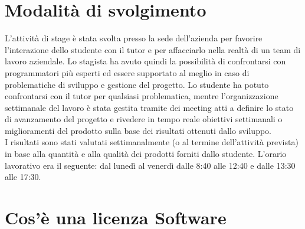 \section{Modalità di svolgimento}
L’attività di stage è stata svolta presso la sede dell’azienda per favorire l’interazione dello studente con il tutor e per affacciarlo nella realtà di un team di lavoro aziendale. Lo stagista ha avuto quindi la possibilità di confrontarsi con programmatori più esperti ed essere supportato al meglio in caso di problematiche di sviluppo e gestione del progetto.
Lo studente ha potuto confrontarsi con il tutor per qualsiasi problematica, mentre l’organizzazione settimanale del lavoro è stata gestita tramite dei meeting atti a definire lo stato di avanzamento del progetto e rivedere in tempo reale obiettivi settimanali o miglioramenti del prodotto sulla base dei risultati ottenuti dallo sviluppo.\\ I risultati sono stati valutati settimanalmente (o al termine dell’attività prevista) in base alla quantità e alla qualità dei prodotti forniti dallo studente.
L’orario lavorativo era il seguente: dal lunedì al venerdì dalle 8:40 alle 12:40 e dalle 13:30 alle 17:30.

\section{Cos'è una licenza Software}

